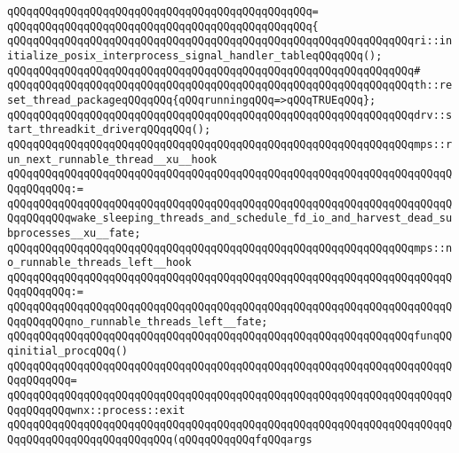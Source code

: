 \verb|qQQqqQQqqQQqqQQqqQQqqQQqqQQqqQQqqQQqqQQqqQQqqQQq=|\newline
\verb|qQQqqQQqqQQqqQQqqQQqqQQqqQQqqQQqqQQqqQQqqQQqqQQq{|\newline
\verb|qQQqqQQqqQQqqQQqqQQqqQQqqQQqqQQqqQQqqQQqqQQqqQQqqQQqqQQqqQQqqQQqri::initialize_posix_interprocess_signal_handler_tableqQQqqQQq();|\newline
\verb|qQQqqQQqqQQqqQQqqQQqqQQqqQQqqQQqqQQqqQQqqQQqqQQqqQQqqQQqqQQqqQQq#|\newline
\verb|qQQqqQQqqQQqqQQqqQQqqQQqqQQqqQQqqQQqqQQqqQQqqQQqqQQqqQQqqQQqqQQqth::reset_thread_packageqQQqqQQq{qQQqrunningqQQq=>qQQqTRUEqQQq};|\newline
\newline
\verb|qQQqqQQqqQQqqQQqqQQqqQQqqQQqqQQqqQQqqQQqqQQqqQQqqQQqqQQqqQQqqQQqdrv::start_threadkit_driverqQQqqQQq();|\newline
\newline
\verb|qQQqqQQqqQQqqQQqqQQqqQQqqQQqqQQqqQQqqQQqqQQqqQQqqQQqqQQqqQQqqQQqmps::run_next_runnable_thread__xu__hook|\newline
\verb|qQQqqQQqqQQqqQQqqQQqqQQqqQQqqQQqqQQqqQQqqQQqqQQqqQQqqQQqqQQqqQQqqQQqqQQqqQQqqQQq:=|\newline
\verb|qQQqqQQqqQQqqQQqqQQqqQQqqQQqqQQqqQQqqQQqqQQqqQQqqQQqqQQqqQQqqQQqqQQqqQQqqQQqqQQqwake_sleeping_threads_and_schedule_fd_io_and_harvest_dead_subprocesses__xu__fate;|\newline
\newline
\verb|qQQqqQQqqQQqqQQqqQQqqQQqqQQqqQQqqQQqqQQqqQQqqQQqqQQqqQQqqQQqqQQqmps::no_runnable_threads_left__hook|\newline
\verb|qQQqqQQqqQQqqQQqqQQqqQQqqQQqqQQqqQQqqQQqqQQqqQQqqQQqqQQqqQQqqQQqqQQqqQQqqQQqqQQq:=|\newline
\verb|qQQqqQQqqQQqqQQqqQQqqQQqqQQqqQQqqQQqqQQqqQQqqQQqqQQqqQQqqQQqqQQqqQQqqQQqqQQqqQQqno_runnable_threads_left__fate;|\newline
\newline
\verb|qQQqqQQqqQQqqQQqqQQqqQQqqQQqqQQqqQQqqQQqqQQqqQQqqQQqqQQqqQQqqQQqfunqQQqinitial_procqQQq()|\newline
\verb|qQQqqQQqqQQqqQQqqQQqqQQqqQQqqQQqqQQqqQQqqQQqqQQqqQQqqQQqqQQqqQQqqQQqqQQqqQQqqQQq=|\newline
\verb|qQQqqQQqqQQqqQQqqQQqqQQqqQQqqQQqqQQqqQQqqQQqqQQqqQQqqQQqqQQqqQQqqQQqqQQqqQQqqQQqwnx::process::exit|\newline
\verb|qQQqqQQqqQQqqQQqqQQqqQQqqQQqqQQqqQQqqQQqqQQqqQQqqQQqqQQqqQQqqQQqqQQqqQQqqQQqqQQqqQQqqQQqqQQqqQQq(qQQqqQQqqQQqfqQQqargs|\newline
